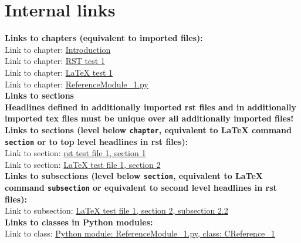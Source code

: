 \section{Internal links}

\textbf{Links to chapters (equivalent to imported files):}\\

Link to chapter: \hyperref[introduction]{Introduction}\\

Link to chapter: \hyperref[rst-test-1]{RST test 1}\\

Link to chapter: \hyperref[latex-test-1]{LaTeX test 1}\\

Link to chapter: \hyperref[referencepackage-referencemodule-1]{ReferenceModule\_1.py}\\

\textbf{Links to sections}\\

\textbf{Headlines defined in additionally imported rst files and in additionally imported tex files must be unique over all additionally imported files!}\\

\textbf{Links to sections (level below \texttt{chapter}, equivalent to LaTeX command \texttt{section} or to top level headlines in rst files):}\\

Link to section: \hyperref[section-1-headline]{rst test file 1, section 1}\\

Link to section: \hyperref[latex-test-1-section-2-headline]{LaTeX test file 1, section 2}\\

\textbf{Links to subsections (level below \texttt{section}, equivalent to LaTeX command \texttt{subsection} or equivalent to second level headlines in rst files):}\\

Link to subsection: \hyperref[latex-test-1-section-2-subsection-2-2-headline]{LaTeX test file 1, section 2, subsection 2.2}\\

\textbf{Links to classes in Python modules:}\\

Link to class: \hyperref[referencepackage-referencemodule-1-creference-1]{Python module: ReferenceModule\_1.py, class: CReference\_1}\\

